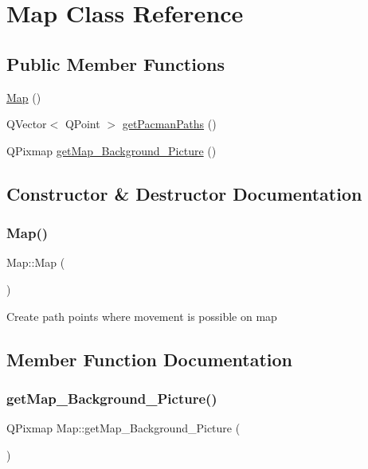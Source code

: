 \hypertarget{class_map}{}\section{Map Class Reference}
\label{class_map}
\subsection*{Public Member Functions}
\begin{DoxyCompactItemize}
\item 
\mbox{\hyperlink{class_map_a0f5ad0fd4563497b4214038cbca8b582}{Map}} ()
\item 
Q\+Vector$<$ Q\+Point $>$ \mbox{\hyperlink{class_map_aee970930932db68180c88ba37c488fc3}{get\+Pacman\+Paths}} ()
\item 
Q\+Pixmap \mbox{\hyperlink{class_map_acc37a7c416a8300577a5a107fc1690d2}{get\+Map\+\_\+\+Background\+\_\+\+Picture}} ()
\end{DoxyCompactItemize}


\subsection{Constructor \& Destructor Documentation}
\mbox{\label{class_map_a0f5ad0fd4563497b4214038cbca8b582}} 
\subsubsection{\texorpdfstring{Map()}{Map()}}
{\footnotesize\ttfamily Map\+::\+Map (\begin{DoxyParamCaption}{ }\end{DoxyParamCaption})}

Create path points where movement is possible on map 

\subsection{Member Function Documentation}
\mbox{\label{class_map_acc37a7c416a8300577a5a107fc1690d2}} 
\subsubsection{\texorpdfstring{get\+Map\+\_\+\+Background\+\_\+\+Picture()}{getMap\_Background\_Picture()}}
{\footnotesize\ttfamily Q\+Pixmap Map\+::get\+Map\+\_\+\+Background\+\_\+\+Picture (\begin{DoxyParamCaption}{ }\end{DoxyParamCaption})\hspace{0.3cm}{\ttfamily [inline]}}

